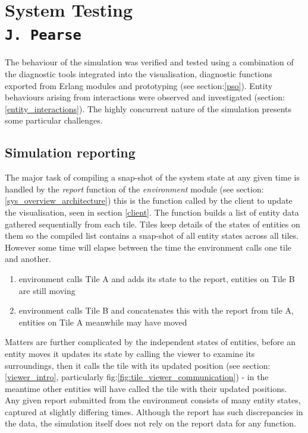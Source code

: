 \pagestyle{empty}
\section{System Testing \\{\small\tt{J.~Pearse}}}
The behaviour of the simulation was verified and tested using a combination of the diagnostic tools integrated into the visualisation, diagnostic functions exported from Erlang modules and prototyping (see section:\ref{pso}). Entity behaviours arising from interactions were observed and investigated (section:\ref{entity_interactions}). The highly concurrent nature of the simulation presents some particular challenges.

\subsection{Simulation reporting}
The major task of compiling a snap-shot of the system state at any given time is handled by the \emph{report} function of the \emph{environment} module (see section: \ref{sys_overview_architecture}) this is the function called by the client to update the visualisation, seen in section \ref{client}.
The function builds a list of entity data gathered sequentially from each tile. Tiles keep details of the states of entities on them so the compiled list contains a snap-shot of all entity states across all tiles. However some time will elapse between the time the environment calls one tile and another.
\begin{enumerate}
\item{environment calls Tile A and adds its state to the report, entities on Tile B are still moving}
\item{environment calls Tile B and concatenates this with the report from tile A, entities on Tile A meanwhile may have moved}
\end{enumerate}
Matters are further complicated by the independent states of entities, before an entity moves it updates its state by calling the viewer to examine its surroundings, then it calls the tile with its updated position (see section:\ref{viewer_intro}, particularly fig:\ref{fig:tile_viewer_communication})  - in the meantime other entities will have called the tile with their updated positions.
Any given report submitted from the environment consists of many entity states, captured at slightly differing times. Although the report has such discrepancies in the data, the simulation itself does not rely on the report data for any function.
